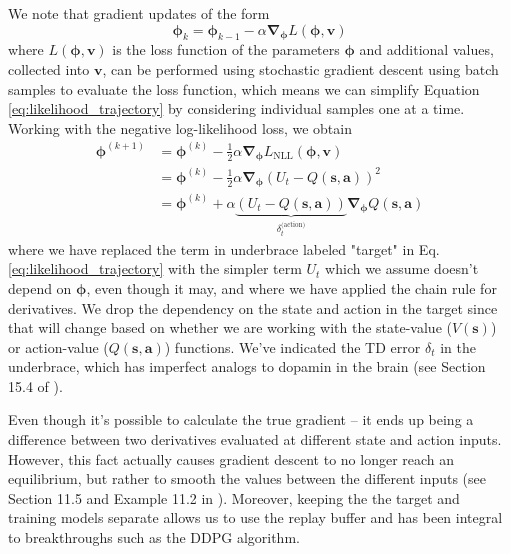 \documentclass{article}
\begin{document}
We note that gradient updates of the form 
\begin{equation}\label{eq:simple_gradient_update}
\boldsymbol{\phi}_{k}=\boldsymbol{\phi}_{k-1}-\alpha \boldsymbol{\nabla}_{\boldsymbol{\phi}}L(\boldsymbol{\phi},\mathbf{v})
\end{equation}where $L(\boldsymbol{\phi},\mathbf{v})$ is the loss function of the parameters $\boldsymbol{\phi}$ and additional values, collected into $\mathbf{v}$, can be performed using stochastic gradient descent using batch samples to evaluate the loss function, which means we can simplify Equation \ref{eq:likelihood_trajectory} by considering individual samples one at a time. Working with the negative log-likelihood loss, we obtain \begin{equation}\begin{split}\label{eq:semi_gradient}
\boldsymbol{\phi}^{(k+1)}&=\boldsymbol{\phi}^{(k)}-\frac{1}{2}\alpha \boldsymbol{\nabla}_{\boldsymbol{\phi}}L_\text{NLL}(\boldsymbol{\phi},\mathbf{v})\\&=\boldsymbol{\phi}^{(k)}-\frac{1}{2}\alpha \boldsymbol{\nabla}_{\boldsymbol{\phi}}\left(U_t-Q(\mathbf{s},\mathbf{a})\right)^2\\&=\boldsymbol{\phi}^{(k)}+\alpha \underbrace{\left(U_t-Q(\mathbf{s},\mathbf{a})\right)}_{\delta_t^\text{(action)}}\boldsymbol{\nabla}_{\boldsymbol{\phi}}Q(\mathbf{s},\mathbf{a})\end{split}\end{equation} where we have replaced the term in underbrace labeled "target" in Eq. \ref{eq:likelihood_trajectory} with the simpler term $U_t$ which we assume doesn't depend on $\boldsymbol{\phi}$, even though it may, and where we have applied the chain rule for derivatives. We drop the dependency on the state and action in the target since that will change based on whether we are working with the state-value ($V(\mathbf{s})$) or action-value ($Q(\mathbf{s},\mathbf{a})$) functions. We've indicated the TD error $\delta_t$ in the underbrace, which has imperfect analogs to dopamin in the brain (see Section 15.4 of \cite{sutton_barto_rl}).

Even though it's possible to calculate the true gradient -- it ends up being a difference between two derivatives evaluated at different state and action inputs. However, this fact actually causes gradient descent to no longer reach an equilibrium, but rather to smooth the values between the different inputs (see Section 11.5 and Example 11.2 in \cite{sutton_barto_rl}). Moreover, keeping the the target and training models separate allows us to use the replay buffer and has been integral to breakthroughs such as the DDPG algorithm\cite{DDPG}. 
\end{document}

